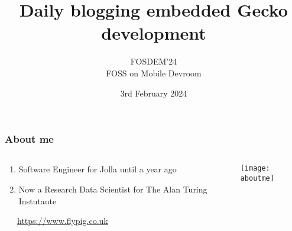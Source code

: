 \documentclass[
	notes=none,
	aspectratio=169
]{beamer}
\begin{document}
\title{Daily blogging embedded Gecko development}
\subtitle{FOSDEM'24\\FOSS on Mobile Devroom}
\date{3rd February 2024}


\renewcommand{\thefootnote}{\arabic{footnote}}

\frame{
\titlepage
}
\note{
}

\renewcommand{\thefootnote}{\fnsymbol{footnote}}


\begin{frame}
\frametitle{About me}

\begin{columns}[T]
\begin{column}[T]{0.4\textwidth}
\setlength{\parskip}{0.5em}

\vspace{1.0cm}
\begin{enumerate}
\setlength{\parskip}{0.5em}
\item Software Engineer for Jolla until a year ago
\item Now a Research Data Scientist for The Alan Turing Instutaute
\end{enumerate}
\ \ \ \url{https://www.flypig.co.uk}

\end{column}
\begin{column}[T]{0.6\textwidth}
\setlength{\parskip}{0.5em}

\vspace{0.5cm}
\begin{center}
\texttt{[image: aboutme]}
\end{center}

\end{column}
\end{columns}

\end{frame}

\end{document}
